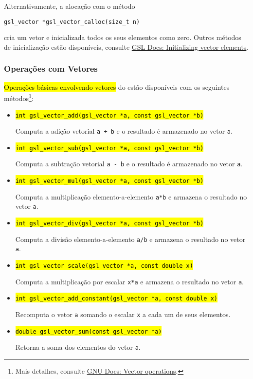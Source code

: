 \documentclass[12pt]{article}
\begin{document}
\begin{obs}
  Alternativamente, a alocação com o método
\begin{lstlisting}
gsl_vector *gsl_vector_calloc(size_t n)
\end{lstlisting}
  cria um vetor e inicializada todos os seus elementos como zero. Outros métodos de inicialização estão disponíveis, consulte \href{https://www.gnu.org/software/gsl/doc/html/vectors.html#initializing-vector-elements}{GSL Docs: Initializing vector elements}.
\end{obs}

\subsubsection{Operações com Vetores}

\hl{Operações básicas envolvendo vetores} do {\gsl} estão disponíveis com os seguintes métodos\footnote{Mais detalhes, consulte \href{https://www.gnu.org/software/gsl/doc/html/vectors.html\#vector-operations}{GNU Docs: Vector operations}.}:
\begin{itemize}
\item \hl{{\lstinline!int gsl_vector_add(gsl_vector *a, const gsl_vector *b)!}}

  Computa a adição vetorial \lstinline!a + b! e o resultado é armazenado no vetor \lstinline+a+.

\item \hl{{\lstinline!int gsl_vector_sub(gsl_vector *a, const gsl_vector *b)!}}

  Computa a subtração vetorial \lstinline!a - b! e o resultado é armazenado no vetor \lstinline!a!.

\item \hl{{\lstinline!int gsl_vector_mul(gsl_vector *a, const gsl_vector *b)!}}

  Computa a multiplicação elemento-a-elemento \lstinline!a*b! e armazena o resultado no vetor \lstinline!a!.

\item \hl{{\lstinline!int gsl_vector_div(gsl_vector *a, const gsl_vector *b)!}}

  Computa a divisão elemento-a-elemento \lstinline!a/b! e armazena o resultado no vetor \lstinline!a!.

\item \hl{{\lstinline!int gsl_vector_scale(gsl_vector *a, const double x)!}}

  Computa a multiplicação por escalar \lstinline!x*a! e armazena o resultado no vetor \lstinline!a!.

\item \hl{{\lstinline!int gsl_vector_add_constant(gsl_vector *a, const double x)!}}

  Recomputa o vetor \lstinline!a! somando o escalar \lstinline!x! a cada um de seus elementos.

\item \hl{{\lstinline!double gsl_vector_sum(const gsl_vector *a)!}}

  Retorna a soma dos elementos do vetor \lstinline!a!.
\end{itemize}
\end{document}

